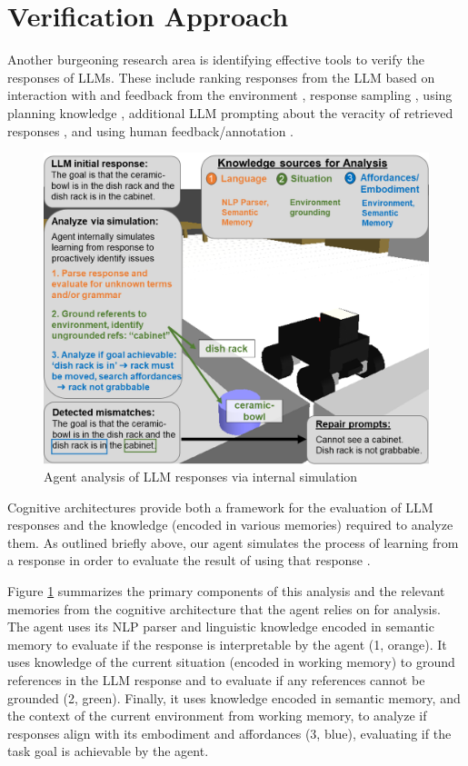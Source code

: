 \documentclass[letterpaper]{article} %
\begin{document}
\section{Verification Approach}

Another burgeoning research area is identifying effective tools to verify the responses of LLMs. These include ranking responses from the LLM based on interaction with and feedback from the environment \citet{logeswaran_few-shot_2022},  response sampling \cite{wang_self-consistency_2023}, using planning knowledge \cite{valmeekam_planning_2023}, additional LLM prompting about the veracity of retrieved responses \cite{kim_language_2023}, and using human feedback/annotation \cite{wu_tidybot_2023,kirk_improving_2022}.


\begin{figure}[t]
    \centering
    \includegraphics[width=1.0\columnwidth]{figures/AnalysisAndRepairVertical.png}
    \caption{Agent analysis of LLM responses via internal simulation}
    \label{fig:analysis}
\end{figure}

Cognitive architectures provide both a framework for the evaluation of LLM responses and the knowledge (encoded in various memories) required to analyze them. As outlined briefly above, our agent simulates the process of learning from a response in order to evaluate the result of using that response \cite{kirk_improving_2023}.

Figure \ref{fig:analysis} summarizes the primary components of this analysis and the relevant memories from the cognitive architecture that the agent relies on for analysis. The agent uses its NLP parser and linguistic knowledge encoded in semantic memory to evaluate if the response is interpretable by the agent (1, orange). It uses knowledge of the current situation (encoded in working memory) to ground references in the LLM response and to evaluate if any references cannot be grounded (2, green). Finally, it uses knowledge encoded in semantic memory, and the context of the current environment from working memory, to analyze if responses align with its embodiment and affordances (3, blue), evaluating if the task goal is achievable by the agent.
\end{document}

